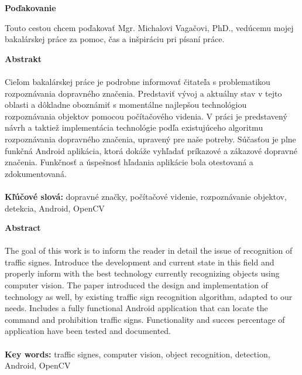 \documentclass[12pt]{article}
\begin{document}
\textbf{Poďakovanie}

Touto cestou chcem poďakovať Mgr. Michalovi Vagačovi, PhD., vedúcemu mojej bakalárskej práce za pomoc, čas a inšpiráciu pri písaní práce.

\thispagestyle{empty}
\clearpage
\centerline{\textbf{Abstrakt}}
\paragraph{}
Cieľom bakalárskej práce je podrobne informovať čitateľa s problematikou rozpoznávania dopravného značenia.
Predstaviť vývoj a aktuálny stav v tejto oblasti a dôkladne oboznámiť s momentálne najlepšou technológiou rozpoznávania objektov pomocou počítačového videnia.
V práci je predstavený návrh a taktiež implementácia technológie podľa existujúceho algoritmu rozpoznávania dopravného značenia, upravený pre naše potreby.
Súčasťou je plne funkčná Android aplikácia, ktorá dokáže vyhľadať príkazové a zákazové dopravné značenia. Funkčnosť a úspešnosť hľadania aplikácie bola otestovaná a zdokumentovaná.
\\\\
\textbf{Kľúčové slová:} dopravné značky, počítačové videnie, rozpoznávanie objektov, detekcia, Android, OpenCV
\thispagestyle{empty}
\clearpage

\centerline{\textbf{Abstract}}
\paragraph{}
The goal of this work is to inform the reader in detail the issue of recognition of traffic signes. Introduce the development and current state in this field and properly inform with the best technology currently recognizing objects using computer vision. The paper introduced the design and implementation of technology as well, by existing traffic sign recognition algorithm, adapted to our needs. Includes a fully functional Android application that can locate the command and prohibition traffic signs. Functionality and succes percentage of application have been tested and documented.
\\\\
\textbf{Key words:} traffic signes, computer vision, object recognition, detection, Android, OpenCV
\thispagestyle{empty}
\clearpage
\tableofcontents
{}
\thispagestyle{empty}
\clearpage
\listoftables
\thispagestyle{empty}
\clearpage
\listoffigures
\thispagestyle{empty}
\clearpage
\lstlistoflistings
\thispagestyle{empty}
\clearpage
\end{document}
